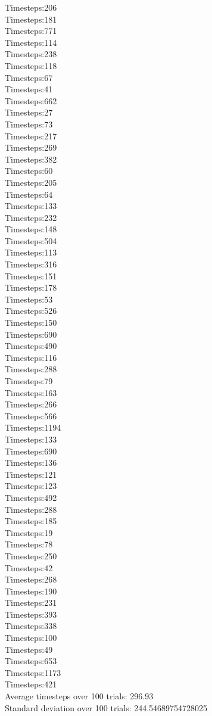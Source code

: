 \documentclass{article}
\begin{document}
Timesteps:206\\
Timesteps:181\\
Timesteps:771\\
Timesteps:114\\
Timesteps:238\\
Timesteps:118\\
Timesteps:67\\
Timesteps:41\\
Timesteps:662\\
Timesteps:27\\
Timesteps:73\\
Timesteps:217\\
Timesteps:269\\
Timesteps:382\\
Timesteps:60\\
Timesteps:205\\
Timesteps:64\\
Timesteps:133\\
Timesteps:232\\
Timesteps:148\\
Timesteps:504\\
Timesteps:113\\
Timesteps:316\\
Timesteps:151\\
Timesteps:178\\
Timesteps:53\\
Timesteps:526\\
Timesteps:150\\
Timesteps:690\\
Timesteps:490\\
Timesteps:116\\
Timesteps:288\\
Timesteps:79\\
Timesteps:163\\
Timesteps:266\\
Timesteps:566\\
Timesteps:1194\\
Timesteps:133\\
Timesteps:690\\
Timesteps:136\\
Timesteps:121\\
Timesteps:123\\
Timesteps:492\\
Timesteps:288\\
Timesteps:185\\
Timesteps:19\\
Timesteps:78\\
Timesteps:250\\
Timesteps:42\\
Timesteps:268\\
Timesteps:190\\
Timesteps:231\\
Timesteps:393\\
Timesteps:338\\
Timesteps:100\\
Timesteps:49\\
Timesteps:653\\
Timesteps:1173\\
Timesteps:421\\
Average timesteps over 100 trials: 296.93\\
Standard deviation over 100 trials: 244.54689754728025\\
\end{document}
